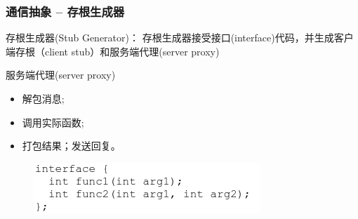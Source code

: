 \begin{frame}[fragile]
    \frametitle{通信抽象 -- 存根生成器}
    存根生成器(Stub Generator)：    存根生成器接受接口(interface)代码，并生成客户端存根（client stub）和服务端代理(server proxy)
    
    服务端代理(server proxy)
    \begin{itemize}
        \item 解包消息;
        \item 调用实际函数;
        \item 打包结果；发送回复。
        
    \end{itemize}
    
    \begin{figure}
        \includegraphics[width=0.6\linewidth]{figs/rpc-interface.png}
    \end{figure}
\end{frame}

